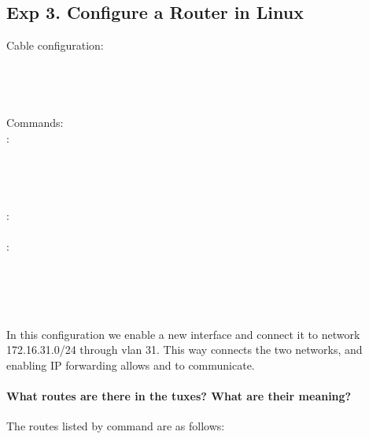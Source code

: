 \documentclass[compilation.tex]{subfiles}
\begin{document}

\subsection[Configure a Router in Linux]{Exp 3. Configure a Router in Linux}
\label{exp:3}

\begin{cables}{12}{0.45}
	Cable configuration:\\
	\\
	\\
	\\
	\\
	
	Commands:\\
	:\\
	\\
	\\
	\\
	\\
	:\\
	\\
	:\\
	\\
	\\
	\\
	\\
\end{cables}

In this configuration we enable a new interface  and connect it to network 172.16.31.0/24 through vlan 31.
This way  connects the two networks, and enabling IP forwarding allows  and  to communicate.

\paragraph{What routes are there in the tuxes? What are their meaning?}
The routes listed by command  are as follows:
\end{document}

